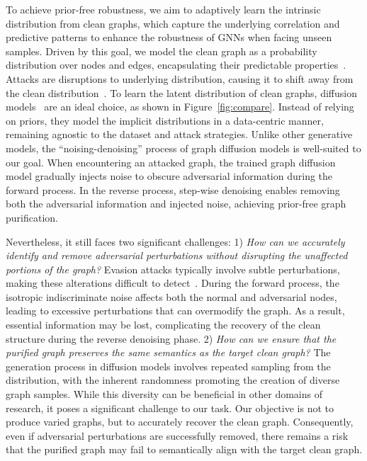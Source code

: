 To achieve prior-free robustness, we aim to adaptively learn the intrinsic distribution from clean graphs, which capture the underlying correlation and predictive patterns to enhance the robustness of GNNs when facing unseen samples.
Driven by this goal, 
we model the clean graph as a probability distribution over nodes and edges, encapsulating their predictable properties~\cite{li2018learning}. Attacks are disruptions to underlying distribution, causing it to shift away from the clean distribution~\cite{li2023revisiting}.
To learn the latent distribution of clean graphs, diffusion models~\cite{niu2020permutation,vignac2022digress} are an ideal choice, as shown in Figure~\ref{fig:compare}. Instead of relying on priors, they model the implicit distributions in a data-centric manner, remaining agnostic to the dataset and attack strategies.
Unlike other generative models, the ``noising-denoising'' process of graph diffusion models is well-suited to our goal. 
When encountering an attacked graph, the trained graph diffusion model gradually injects noise to obscure adversarial information during the forward process. 
In the reverse process, step-wise denoising enables removing both the adversarial information and injected noise, achieving prior-free graph purification. 

Nevertheless, it still faces two significant challenges:
1) \textit{How can we accurately identify and remove adversarial perturbations without disrupting the unaffected portions of the graph?}
Evasion attacks typically involve subtle perturbations, making these alterations difficult to detect~\cite{sun2022adversarial}.
During the forward process, the isotropic indiscriminate noise affects both the normal and adversarial nodes, leading to excessive perturbations that can overmodify the graph. As a result, essential information may be lost, complicating the recovery of the clean structure during the reverse denoising phase.
2) \textit{How can we ensure that the purified graph preserves the same semantics as the target clean graph?}
The generation process in diffusion models involves repeated sampling from the distribution, with the inherent randomness promoting the creation of diverse graph samples. While this diversity can be beneficial in other domains of research, it poses a significant challenge to our task. Our objective is not to produce varied graphs, but to accurately recover the clean graph. Consequently, even if adversarial perturbations are successfully removed, there remains a risk that the purified graph may fail to semantically align with the target clean graph.



